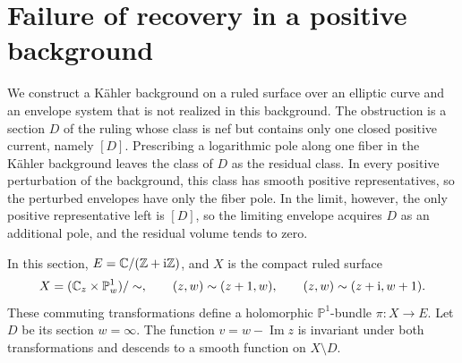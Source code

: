 \section{Failure of recovery in a positive background}
\label{sec:envelope-boundary-example}

We construct a K\"ahler background on a ruled surface over an elliptic curve and an envelope system that is not realized in this background. The obstruction is a section $D$ of the ruling whose class is nef but contains only one closed positive current, namely $[D]$. Prescribing a logarithmic pole along one fiber in the K\"ahler background leaves the class of $D$ as the residual class. In every positive perturbation of the background, this class has smooth positive representatives, so the perturbed envelopes have only the fiber pole. In the limit, however, the only positive representative left is $[D]$, so the limiting envelope acquires $D$ as an additional pole, and the residual volume tends to zero.

In this section, $E=\mathbb C/(\mathbb Z+\mathrm i\mathbb Z)$, and $X$ is the compact ruled surface
\[
 X=(\mathbb C_z\times\mathbb P^1_w)/\sim,
 \qquad (z,w)\sim(z+1,w),\qquad
 (z,w)\sim(z+\mathrm i,w+1).
\]
These commuting transformations define a holomorphic $\mathbb P^1$-bundle $\pi\colon X\to E$. Let $D$ be its section $w=\infty$. The function $v=w-\operatorname{Im}z$ is invariant under both transformations and descends to a smooth function on $X\setminus D$.

